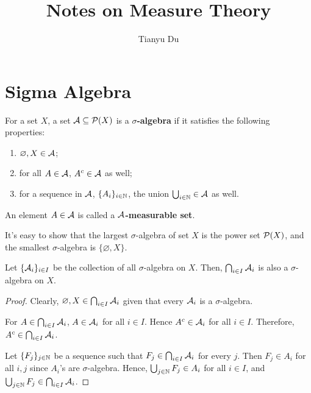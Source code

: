 \documentclass[11pt]{article}
\title{Notes on Measure Theory}
\author{Tianyu Du}
\numberwithin{equation}{section}
\newcommand{\s}[0]{$\sigma$}
\begin{document}
	
	\maketitle
	\tableofcontents
	\section{Sigma Algebra}
	\begin{definition}
		For a set $X$, a set $\mathcal{{A}} \subseteq \mathcal{{P}}(X)$ is a \textbf{\s-algebra} if it satisfies the following properties:
		\begin{enumerate}
			\item $\varnothing, X \in \mathcal{{A}}$;
			\item for all $A \in \mathcal{{A}}$, $A^c \in \mathcal{{A}}$ as well;
			\item for a sequence in $\mathcal{{A}}$, $\{A_i\}_{i\in\mathbb{N}}$, the union $\bigcup_{i\in\mathbb{N}} \in \mathcal{{A}}$ as well.
		\end{enumerate}
		An element $A \in \mathcal{{A}}$ is called a \textbf{$\mathcal{{A}}$-measurable set}.
	\end{definition}
	
	\begin{remark}
		It's easy to show that the largest \s-algebra of set $X$ is the power set $\mathcal{{P}}(X)$, and the smallest \s-algebra is $\{\varnothing, X\}$.
	\end{remark}
	
	\begin{theorem}
		Let $\{\mathcal{{A}}_i\}_{i \in I}$ be the collection of all $\sigma$-algebra on $X$. Then, $\bigcap_{i \in I} \mathcal{{A}}_i$ is also a $\sigma$-algebra on $X$.
	\end{theorem}
	
	\begin{proof}
		Clearly, $\varnothing, X \in \bigcap_{i \in I} \mathcal{{A}}_i$ given that every $\mathcal{{A}}_i$ is a \s-algebra.
		
		For $A \in \bigcap_{i \in I} \mathcal{{A}}_i$, $A \in \mathcal{{A}}_i$ for all $i \in I$. Hence $A^c \in \mathcal{{A}}_i$ for all $i \in I$. Therefore, $A^c \in \bigcap_{i \in I} \mathcal{{A}}_i$.
		
		Let $\{F_j\}_{j \in \mathbb{N}}$ be a sequence such that $F_j \in \bigcap_{i \in I} \mathcal{{A}}_i$ for every $j$. Then $F_j \in A_i$ for all $i, j$ since $A_i$'s are \s-algebra. Hence, $\bigcup_{j \in \mathbb{N}} F_j \in A_i$ for all $i \in I$, and $\bigcup_{j \in \mathbb{N}} F_j \in \bigcap_{i \in I} \mathcal{{A}}_i$.
	\end{proof}
	
\end{document}
